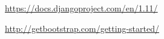 \begin{thebibliography}{99999}
\singlespace\normalsize

 \url{https://docs.djangoproject.com/en/1.11/}


 \url{http://getbootstrap.com/getting-started/}


\end{thebibliography}